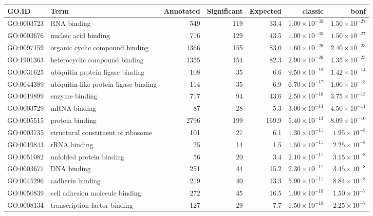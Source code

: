 \begin{table}[ht]
\centering
\begin{tabular}{llrrrrr}
  \hline
GO.ID & Term & Annotated & Significant & Expected & classic & bonf \\ 
  \hline
GO:0003723 & RNA binding & 549 & 119 & 33.4 & $1.00 \times 10^{-30}$ & $1.50 \times 10^{-27}$ \\ 
  GO:0003676 & nucleic acid binding & 716 & 129 & 43.5 & $1.00 \times 10^{-30}$ & $1.50 \times 10^{-27}$ \\ 
  GO:0097159 & organic cyclic compound binding & 1366 & 155 & 83.0 & $1.60 \times 10^{-26}$ & $2.40 \times 10^{-23}$ \\ 
  GO:1901363 & heterocyclic compound binding & 1355 & 154 & 82.3 & $2.90 \times 10^{-26}$ & $4.35 \times 10^{-23}$ \\ 
  GO:0031625 & ubiquitin protein ligase binding & 108 & 35 & 6.6 & $9.50 \times 10^{-18}$ & $1.42 \times 10^{-14}$ \\ 
  GO:0044389 & ubiquitin-like protein ligase binding & 114 & 35 & 6.9 & $6.70 \times 10^{-17}$ & $1.00 \times 10^{-13}$ \\ 
  GO:0019899 & enzyme binding & 717 & 94 & 43.6 & $2.50 \times 10^{-16}$ & $3.75 \times 10^{-13}$ \\ 
  GO:0003729 & mRNA binding & 87 & 28 & 5.3 & $3.00 \times 10^{-14}$ & $4.50 \times 10^{-11}$ \\ 
  GO:0005515 & protein binding & 2796 & 199 & 169.9 & $5.40 \times 10^{-13}$ & $8.09 \times 10^{-10}$ \\ 
  GO:0003735 & structural constituent of ribosome & 101 & 27 & 6.1 & $1.30 \times 10^{-11}$ & $1.95 \times 10^{-8}$ \\ 
  GO:0019843 & rRNA binding & 25 & 14 & 1.5 & $1.50 \times 10^{-11}$ & $2.25 \times 10^{-8}$ \\ 
  GO:0051082 & unfolded protein binding & 56 & 20 & 3.4 & $2.10 \times 10^{-11}$ & $3.15 \times 10^{-8}$ \\ 
  GO:0003677 & DNA binding & 251 & 44 & 15.2 & $2.30 \times 10^{-11}$ & $3.45 \times 10^{-8}$ \\ 
  GO:0045296 & cadherin binding & 219 & 40 & 13.3 & $5.90 \times 10^{-11}$ & $8.84 \times 10^{-8}$ \\ 
  GO:0050839 & cell adhesion molecule binding & 272 & 45 & 16.5 & $1.00 \times 10^{-10}$ & $1.50 \times 10^{-7}$ \\ 
  GO:0008134 & transcription factor binding & 127 & 29 & 7.7 & $1.50 \times 10^{-10}$ & $2.25 \times 10^{-7}$ \\ 

\end{tabular}
\end{table}
